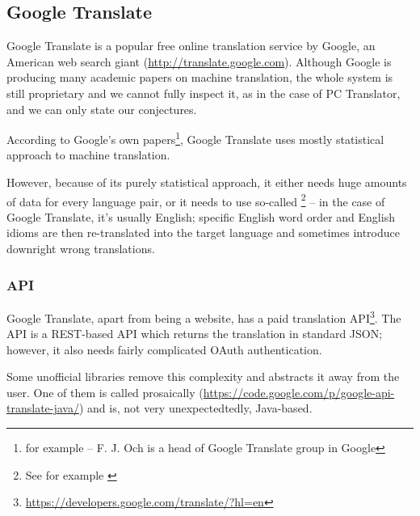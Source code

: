 \subsection{Google Translate}
\label{google}
Google Translate is a popular free online translation service by Google, an American web search giant (\url{http://translate.google.com}). 
Although Google is producing many academic papers on machine translation, the whole system is still proprietary and we cannot fully inspect it, as in the case of PC Translator, and we can only state our conjectures.

According to Google's own papers\footnote{for example \cite{och} -- F. J. Och is a head of Google Translate group in Google}, Google Translate uses mostly statistical approach to machine translation.

However, because of its purely statistical approach, it either needs huge amounts of data for every language pair, or it needs to use so-called \footnote{See for example \cite{koehn2010statistical}} -- in the case of Google Translate, it's usually English; specific English word order and English idioms are then re-translated into the target language and sometimes introduce downright wrong translations.

\subsubsection{API}
Google Translate, apart from being a website, has a paid translation API\footnote{\url{https://developers.google.com/translate/?hl=en}}. The API is a REST-based API which returns the translation in standard JSON; however, it also needs fairly complicated OAuth authentication.

Some unofficial libraries remove this complexity and abstracts it away from the user.
One of them is called prosaically  (\url{https://code.google.com/p/google-api-translate-java/}) and is, not very unexpectedtedly, Java-based.


